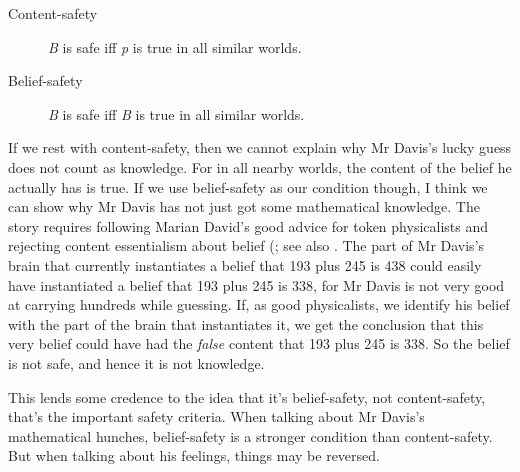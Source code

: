 \begin{description}
\item[Content-safety] \textit{B} is safe iff \textit{p} is true in all similar worlds.
\item[Belief-safety] \textit{B} is safe iff \textit{B} is true in all similar worlds.
\end{description}

\noindent If we rest with content-safety, then we cannot explain why Mr Davis's lucky guess does not count as knowledge. For in all nearby worlds, the content of the belief he actually has is true. If we use belief-safety as our condition though, I think we can show why Mr Davis has not just got some mathematical knowledge. The story requires following Marian David's good advice for token physicalists and rejecting content essentialism about belief (\citet{David2002}; see also \citet{Gibbons1993}. The part of Mr Davis's brain that currently instantiates a belief that 193 plus 245 is 438 could easily have instantiated a belief that 193 plus 245 is 338, for Mr Davis is not very good at carrying hundreds while guessing. If, as good physicalists, we identify his belief with the part of the brain that instantiates it, we get the conclusion that this very belief could have had the \textit{false} content that 193 plus 245 is 338. So the belief is not safe, and hence it is not knowledge.

This lends some credence to the idea that it's belief-safety, not content-safety, that's the important safety criteria. When talking about Mr Davis's mathematical hunches, belief-safety is a stronger condition than content-safety. But when talking about his feelings, things may be reversed. 

